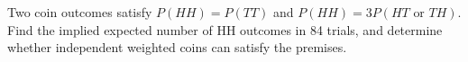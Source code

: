 Two coin outcomes satisfy $P(HH)=P(TT)$ and $P(HH)=3P(HT\text{ or }TH)$. Find the implied expected number of HH outcomes in 84 trials, and determine whether independent weighted coins can satisfy the premises.

